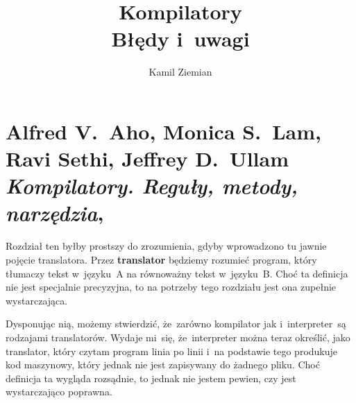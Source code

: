 \documentclass[a4paper,11pt]{article}
\title{Kompilatory \\
  {\Large Błędy i~uwagi}}
\author{Kamil Ziemian}
\numberwithin{equation}{section}
\begin{document}





\maketitle










\section{Alfred V.~Aho, Monica S.~Lam, Ravi Sethi,
  Jeffrey D.~Ullam \textit{Kompilatory. Reguły, metody,
    narzędzia},
  \parencite{Aho-Lam-Sethi-Ullman-Kompilatory-Pub-2019}}

\vspace{0em}



\vspace{0em}


\noindent
Rozdział ten byłby prostszy do zrozumienia, gdyby wprowadzono tu jawnie
pojęcie translatora. Przez \textbf{translator} będziemy rozumieć program,
który tłumaczy tekst w~języku~A na równoważny tekst w~języku~B. Choć ta
definicja nie jest specjalnie precyzyjna, to na potrzeby tego rozdziału
jest ona zupełnie wystarczająca.

Dysponując nią, możemy stwierdzić, że~zarówno kompilator jak
i~interpreter~są rodzajami translatorów. Wydaje mi~się, że~interpreter można
teraz określić, jako translator, który czytam program linia po linii i~na
podstawie tego produkuje kod maszynowy, który jednak nie jest zapisywany
do żadnego pliku. Choć definicja ta wygląda rozsądnie, to jednak nie jestem
pewien, czy jest wystarczająco poprawna.
\end{document}
